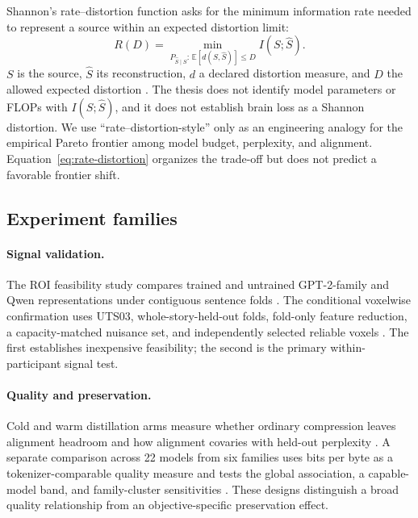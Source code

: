 Shannon's rate--distortion function asks for the minimum information rate needed to represent a source within an expected distortion limit:
\begin{equation}
  R(D)=\min_{P_{\hat S\mid S}:\,\mathbb{E}[d(S,\hat S)]\leq D} I(S;\hat S) .
  \label{eq:rate-distortion}
\end{equation}
$S$ is the source, $\hat S$ its reconstruction, $d$ a declared distortion measure, and $D$ the allowed expected distortion \autocite{cover2006}.
The thesis does not identify model parameters or FLOPs with $I(S;\hat S)$, and it does not establish brain loss as a Shannon distortion.
We use ``rate--distortion-style'' only as an engineering analogy for the empirical Pareto frontier among model budget, perplexity, and alignment.
Equation~\ref{eq:rate-distortion} organizes the trade-off but does not predict a favorable frontier shift.

\subsection{Experiment families}

\paragraph{Signal validation.}
The ROI feasibility study compares trained and untrained GPT-2-family and Qwen representations under contiguous sentence folds .
The conditional voxelwise confirmation uses UTS03, whole-story-held-out folds, fold-only feature reduction, a capacity-matched nuisance set, and independently selected reliable voxels .
The first establishes inexpensive feasibility; the second is the primary within-participant signal test.

\paragraph{Quality and preservation.}
Cold and warm distillation arms measure whether ordinary compression leaves alignment headroom and how alignment covaries with held-out perplexity .
A separate comparison across 22 models from six families uses bits per byte as a tokenizer-comparable quality measure and tests the global association, a capable-model band, and family-cluster sensitivities .
These designs distinguish a broad quality relationship from an objective-specific preservation effect.

